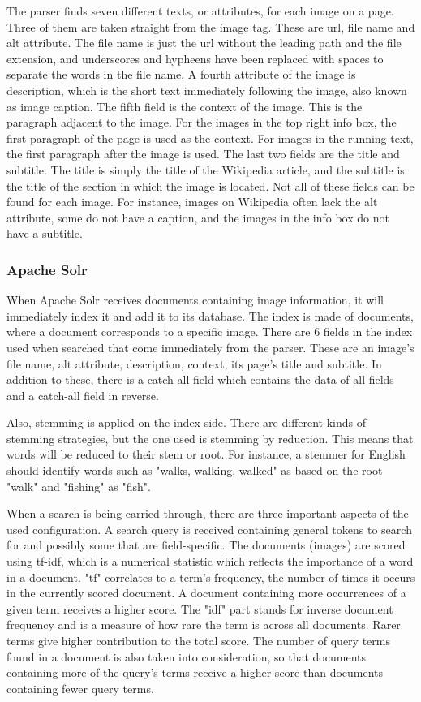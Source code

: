 \documentclass[a4paper]{article}
\begin{document}
The parser finds seven different texts, or attributes, for each image on a page. Three of them are taken straight from the image tag. These are url, file name and alt attribute. The file name is just the url without the leading path and the file extension, and underscores and hypheens have been replaced with spaces to separate the words in the file name. A fourth attribute of the image is description, which is the short text immediately following the image, also known as image caption. The fifth field is the context of the image. This is the paragraph adjacent to the image. For the images in the top right info box, the first paragraph of the page is used as the context. For images in the running text, the first paragraph after the image is used. The last two fields are the title and subtitle. The title is simply the title of the Wikipedia article, and the subtitle is the title of the section in which the image is located. Not all of these fields can be found for each image. For instance, images on Wikipedia often lack the alt attribute, some do not have a caption, and the images in the info box do not have a subtitle.


\subsubsection{Apache Solr}
When Apache Solr receives documents containing image information, it will immediately index it and add it to its database. The index is made of documents, where a document corresponds to a specific image. There are 6 fields in the index used when searched that come immediately from the parser. These are an image's file name, alt attribute, description, context, its page's title and subtitle. In addition to these, there is a catch-all field which contains the data of all fields and a catch-all field in reverse. 

Also, stemming is applied on the index side. There are different kinds of stemming strategies, but the one used is stemming by reduction. This means that words will be reduced to their stem or root. For instance, a stemmer for English should identify words such as "walks, walking, walked" as based on the root "walk" and "fishing" as "fish". 

When a search is being carried through, there are three important aspects of the used configuration. A search query is received containing general tokens to search for and possibly some that are field-specific. The documents (images) are scored using tf-idf, which is a numerical statistic which reflects the importance of a word in a document. "tf" correlates to a term's frequency, the number of times it occurs in the currently scored document. A document containing more occurrences of a given term receives a higher score. The "idf" part stands for inverse document frequency and is a measure of how rare the term is across all documents. Rarer terms give higher contribution to the total score. The number of query terms found in a document is also taken into consideration, so that documents containing more of the query's terms receive a higher score than documents containing fewer query terms.
\end{document}
